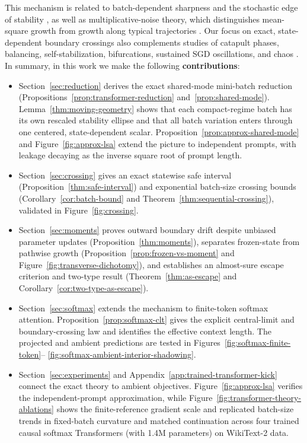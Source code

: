\documentclass[11pt]{article}
\begin{document}
This mechanism is related to batch-dependent sharpness and the stochastic edge of stability \citep{wu2018sgd,lee2023batchsharpness,agarwala2024stochastic}, as well as multiplicative-noise theory, which distinguishes mean-square growth from growth along typical trajectories \citep{hodgkinson2021multiplicative,ziyin2022strength}. Our focus on exact, state-dependent boundary crossings also complements studies of catapult phases, balancing, self-stabilization, bifurcations, sustained SGD oscillations, and chaos \citep{lewkowycz2020large,wang2022large,zhu2023understanding,song2023trajectory,andriushchenko2023sgd,lu2024benign,kong2020stochasticity,herrmann2022chaotic}. In summary, in this work we make the following \textbf{contributions}:
\begin{itemize}[leftmargin=*, noitemsep]
    \item Section~\ref{sec:reduction} derives the exact shared-mode
    mini-batch reduction (Propositions~\ref{prop:transformer-reduction}
    and~\ref{prop:shared-mode}).  Lemma~\ref{thm:moving-geometry} shows that
    each compact-regime batch has its own rescaled stability ellipse and that
    all batch variation enters through one centered, state-dependent scalar.
    Proposition~\ref{prop:approx-shared-mode} and
    Figure~\ref{fig:approx-lsa} extend the picture to independent prompts,
    with leakage decaying as the inverse square root of prompt length.
    \item Section~\ref{sec:crossing} gives an exact statewise safe interval
    (Proposition~\ref{thm:safe-interval}) and exponential batch-size crossing
    bounds (Corollary~\ref{cor:batch-bound} and
    Theorem~\ref{thm:sequential-crossing}), validated in
    Figure~\ref{fig:crossing}.
    \item Section~\ref{sec:moments} proves outward boundary drift despite
    unbiased parameter updates (Proposition~\ref{thm:moments}), separates
    frozen-state from pathwise growth
    (Proposition~\ref{prop:frozen-vs-moment} and
    Figure~\ref{fig:transverse-dichotomy}), and establishes an almost-sure
    escape criterion and two-type result
    (Theorem~\ref{thm:as-escape} and
    Corollary~\ref{cor:two-type-as-escape}).
    \item Section~\ref{sec:softmax} extends the mechanism to finite-token
    softmax attention.  Proposition~\ref{prop:softmax-clt} gives the explicit
    central-limit and boundary-crossing law and identifies the effective
    context length.  The projected and ambient predictions are tested in
    Figures~\ref{fig:softmax-finite-token}--%
    \ref{fig:softmax-ambient-interior-shadowing}.
    \item Section~\ref{sec:experiments} and
    Appendix~\ref{app:trained-transformer-kick} connect the exact theory to
    ambient objectives.  Figure~\ref{fig:approx-lsa} verifies the
    independent-prompt approximation, while
    Figure~\ref{fig:transformer-theory-ablations} shows the finite-reference
    gradient scale and replicated batch-size trends in fixed-batch curvature
    and matched continuation across four trained causal softmax Transformers (with 1.4M parameters) on WikiText-2 data.
\end{itemize}
\end{document}
